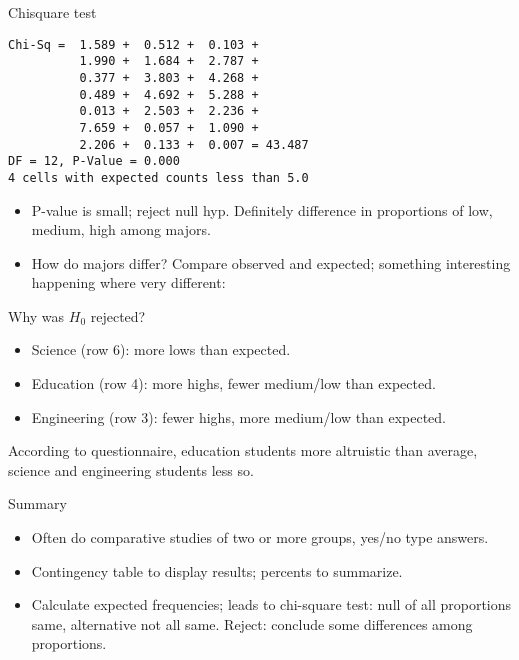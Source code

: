 \begin{slide}{Chisquare test}

\begin{verbatim}
Chi-Sq =  1.589 +  0.512 +  0.103 +
          1.990 +  1.684 +  2.787 +
          0.377 +  3.803 +  4.268 +
          0.489 +  4.692 +  5.288 +
          0.013 +  2.503 +  2.236 +
          7.659 +  0.057 +  1.090 +
          2.206 +  0.133 +  0.007 = 43.487
DF = 12, P-Value = 0.000
4 cells with expected counts less than 5.0
\end{verbatim}
\normalsize

\begin{itemize}
\item 
P-value is small; reject null hyp. Definitely difference in
proportions of low, medium, high among majors.

\item How do majors differ? Compare observed and expected; something
interesting happening where very different:

\end{itemize}
\end{slide}
\begin{slide}{Why was $H_0$ rejected?}

\begin{itemize}
\item Science (row 6): more lows than expected.
\item Education (row 4): more highs, fewer medium/low than expected.
\item Engineering (row 3): fewer highs, more medium/low than expected.
\end{itemize}
According to questionnaire, education students more altruistic than
average, science and engineering students less so.

\end{slide}

\begin{slide}{Summary}

\begin{itemize}
\item Often do comparative studies of two or more groups, yes/no type answers.
\item Contingency table to display results; percents to summarize.
\item Calculate expected frequencies;
leads to chi-square test: null of all proportions same,
  alternative not all same. Reject: conclude some differences among
  proportions.
\end{itemize}
\end{slide}
